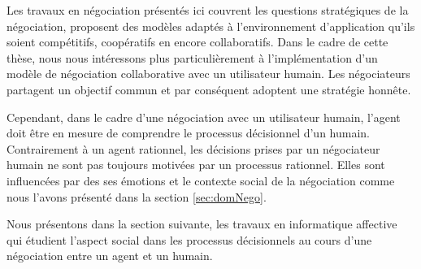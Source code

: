 			Les travaux en négociation présentés ici couvrent les questions stratégiques de la négociation, proposent des modèles adaptés à l'environnement d'application qu'ils soient compétitifs, coopératifs en encore collaboratifs.  Dans le cadre de cette thèse, nous nous intéressons plus particulièrement à l'implémentation d'un modèle de négociation collaborative avec un utilisateur humain. Les négociateurs partagent un objectif commun et par conséquent adoptent une stratégie honnête.
			
			Cependant, dans le cadre d'une négociation avec un utilisateur humain, l'agent doit être en mesure de comprendre le processus décisionnel d'un humain. Contrairement à un agent rationnel, les décisions prises par un négociateur humain ne sont pas toujours motivées par un processus rationnel. Elles sont influencées par des ses émotions et le contexte social de la négociation comme nous l'avons présenté dans la section \ref{sec:domNego}. 
			
			Nous présentons dans la section suivante, les travaux en informatique affective qui étudient l'aspect social dans les processus décisionnels au cours d'une négociation entre un agent et un humain.  
			
			
			
			
	
			
	
		
